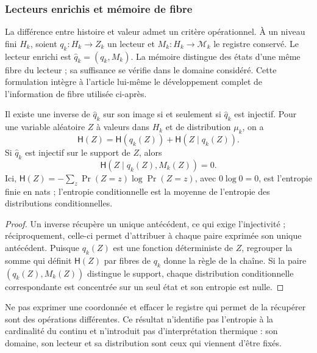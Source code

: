 \subsubsection{Lecteurs enrichis et mémoire de fibre}
\label{hmtfg:base:sec:ch-memoria-fibra}

La différence entre histoire et valeur admet un critère opérationnel. À un
niveau fini \(H_k\), soient \(q_k:H_k\to Z_k\) un lecteur et
\(M_k:H_k\to\mathcal M_k\) le registre conservé. Le lecteur enrichi
est \(\widehat q_k=(q_k,M_k)\). La mémoire distingue des états d'une même
fibre du lecteur ; sa suffisance se vérifie dans le domaine considéré.
Cette formulation intègre à l'article lui-même le développement complet de
l'information de fibre utilisée ci-après.

\begin{proposition}
\label{hmtfg:base:prop:ch-recuperabilidad-fibra}
Il existe une inverse de \(\widehat q_k\) sur son image si et seulement si \(\widehat q_k\) est injectif. Pour une variable aléatoire \(Z\) à valeurs dans \(H_k\) et de distribution \(\mu_k\), on a
\[
 \mathsf H(Z)=\mathsf H(q_k(Z))+\mathsf H(Z\mid q_k(Z)).
\]
Si \(\widehat q_k\) est injectif sur le support de \(Z\), alors
\[
 \mathsf H(Z\mid q_k(Z),M_k(Z))=0.
\]
Ici, \(\mathsf H(Z)=-\sum_z\Pr(Z=z)\log\Pr(Z=z)\), avec
\(0\log0=0\), est l'entropie finie en nats ; l'entropie conditionnelle est
la moyenne de l'entropie des distributions conditionnelles.
\end{proposition}

\begin{proof}
Un inverse récupère un unique antécédent, ce qui exige l’injectivité ;
réciproquement, celle-ci permet d’attribuer à chaque paire exprimée son unique
antécédent. Puisque \(q_k(Z)\) est une fonction déterministe de \(Z\),
regrouper la somme qui définit \(\mathsf H(Z)\) par fibres de \(q_k\) donne la
règle de la chaîne. Si la paire \((q_k(Z),M_k(Z))\) distingue le support,
chaque distribution conditionnelle correspondante est concentrée sur un seul
état et son entropie est nulle.
\end{proof}

Ne pas exprimer une coordonnée et effacer le registre qui permet de la récupérer sont
des opérations différentes. Ce résultat n’identifie pas l’entropie à la cardinalité
du continu et n’introduit pas d’interprétation thermique : son domaine, son lecteur et sa
distribution sont ceux qui viennent d’être fixés.

